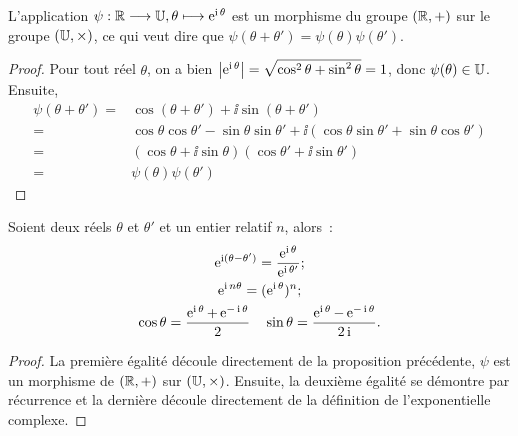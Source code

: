 \begin{prop}
  L'application \(\psi:\mathbb{R} \longrightarrow \mathbb{U}, \theta \longmapsto \operatorname{e}^{\operatorname{i} \theta}\) est un 
  morphisme du groupe \((\mathbb{R}, + )\) sur le groupe \((\mathbb{U},\times)\), ce qui veut 
  dire que \(\psi(\theta + \theta') = \psi(\theta)\psi(\theta')\).
\end{prop}

\begin{proof}
  Pour tout réel \(\theta\), on a bien \(\left\lvert\operatorname{e}^{\operatorname{i} \theta}\right\rvert = \sqrt{\cos^2 
  \theta + \sin^2 \theta} = 1\), donc \(\psi(\theta) \in \mathbb{U}\). Ensuite,
  \begin{align*}
    \psi(\theta  + \theta') = &\cos(\theta  + \theta') + \ii \sin(\theta + 
    \theta')\\
    = &\cos \theta \cos \theta' - \sin \theta \sin \theta'  + \ii(\cos 
    \theta \sin \theta' + \sin \theta \cos \theta')\\
    = &(\cos \theta + \ii \sin \theta)(\cos \theta' + \ii \sin \theta')\\
    = &\psi(\theta) \psi(\theta')
  \end{align*}
\end{proof}

\begin{prop}
  Soient deux réels \(\theta\) et \(\theta'\) et un entier relatif \(n\), 
  alors~:
  \begin{gather}
    \operatorname{e}^{\operatorname{i} (\theta-\theta')} = \frac{\operatorname{e}^{\operatorname{i} \theta}}{\operatorname{e}^{\operatorname{i} \theta'}};\\
    \operatorname{e}^{\operatorname{i} n \theta} = (\operatorname{e}^{\operatorname{i} \theta})^n;\\
    \cos \theta = \frac{\operatorname{e}^{\operatorname{i} \theta} + \operatorname{e}^{-\operatorname{i}\theta}}{2} \quad \sin 
    \theta = \frac{\operatorname{e}^{\operatorname{i} \theta}-\operatorname{e}^{-\operatorname{i}\theta}}{2\operatorname{i}}.
  \end{gather}
\end{prop}

\begin{proof}
  La première égalité découle directement de la proposition précédente, 
  \(\psi\) est un morphisme de \((\mathbb{R}, + )\) sur \((\mathbb{U},\times)\). Ensuite, la 
  deuxième égalité se démontre par récurrence et la dernière découle 
  directement de la définition de l'exponentielle complexe.
\end{proof}

